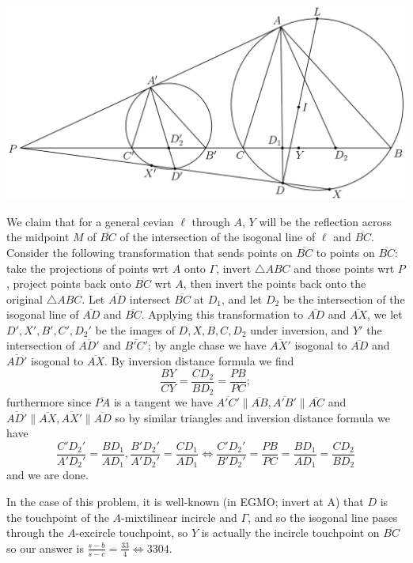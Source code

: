 \begin{solution}\hfil\medskip

    \begin{center}
        \includegraphics[scale=0.4]{Sections/Files/14-2-6.png}
    \end{center}
	
    We claim that for a general cevian $\ell$ through $A$, $Y$ will be the reflection across the midpoint $M$ of $\overline{BC}$ of the intersection of the isogonal
    line of $\ell$ and $\overline{BC}$. Consider the following transformation that sends points on $\overline{BC}$ to points on $\overline{BC}$: take the projections of points
    wrt $A$ onto $\Gamma$, invert $\triangle ABC$ and those points wrt $P$, project points back onto $\overline{BC}$ wrt $A$, then invert the points back onto the original $\triangle ABC$.
    Let $\overline{AD}$ intersect $\overline{BC}$ at $D_1$, and let $D_2$ be the intersection of the isogonal line of $\overline{AD}$ and $\overline{BC}$. Applying
    this transformation to $\overline{AD}$ and $\overline{AX}$, we let $D', X', B', C', D_2'$ be the images of $D, X, B, C, D_2$ under inversion, and $Y'$ the intersection of $\overline{AD'}$
    and $\overline{B'C'}$; by angle chase we have $\overline{AX'}$ isogonal to $\overline{AD}$ and $\overline{AD'}$ isogonal to $\overline{AX}$. 
    By inversion distance formula we find $$\frac{BY}{CY} = \frac{CD_2}{BD_2} = \frac{PB}{PC};$$ furthermore since $\overline{PA}$ is a tangent 
    we have $\overline{A'C'} \parallel \overline{AB}, \overline{A'B'} \parallel \overline{AC}$ and $\overline{AD'} \parallel \overline{AX}, \overline{AX'} \parallel \overline{AD}$
    so by similar triangles and inversion distance formula we have $$\dfrac{C'D_2'}{A'D_2'} = \dfrac{BD_1}{AD_1}, \dfrac{B'D_2'}{A'D_2'} = \dfrac{CD_1}{AD_1} \iff \dfrac{C'D_2'}{B'D_2'} = \dfrac{PB}{PC} = \dfrac{BD_1}{AD_1} = \dfrac{CD_2}{BD_2}$$
    and we are done. \medskip

    In the case of this problem, it is well-known (in EGMO; invert at A) that $D$ is the touchpoint of the $A$-mixtilinear incircle and $\Gamma$, and so the isogonal line pases through
    the $A$-excircle touchpoint, so $Y$ is actually the incircle touchpoint on $\overline{BC}$ so our answer is $\frac{s - b}{s - c} = \frac{33}{4} \iff \boxed{3304}.$
\end{solution}\bigskip
